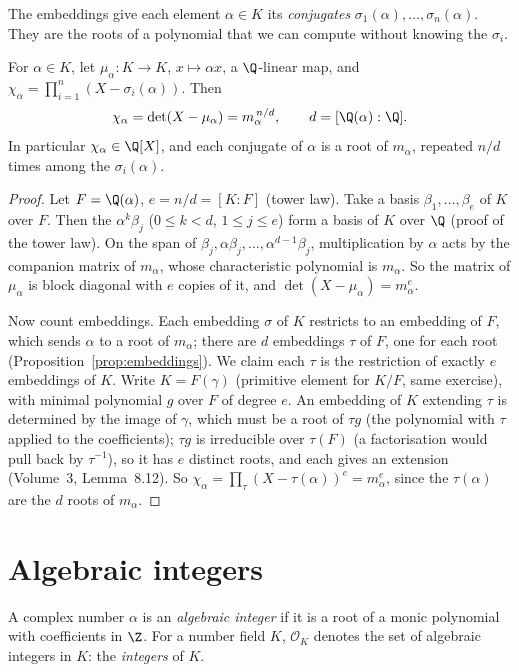 The embeddings give each element $\alpha\in K$ its \emph{conjugates} $\sigma_1(\alpha),\dots,\sigma_n(\alpha)$. They
are the roots of a polynomial that we can compute without knowing the $\sigma_i$.

\begin{proposition}\label{prop:charpoly}
For $\alpha\in K$, let $\mu_\alpha:K\to K$, $x\mapsto\alpha x$, a $\Q$-linear map, and
$\chi_\alpha=\prod_{i=1}^n(X-\sigma_i(\alpha))$. Then
\[
\chi_\alpha=\det(X-\mu_\alpha)=m_\alpha^{\,n/d},\qquad d=[\Q(\alpha):\Q].
\]
In particular $\chi_\alpha\in\Q[X]$, and each conjugate of $\alpha$ is a root of $m_\alpha$, repeated $n/d$ times
among the $\sigma_i(\alpha)$.
\end{proposition}
\begin{proof}
Let $F=\Q(\alpha)$, $e=n/d=[K:F]$ (tower law). Take a basis $\beta_1,\dots,\beta_e$ of $K$ over $F$. Then the
$\alpha^k\beta_j$ ($0\le k<d$, $1\le j\le e$) form a basis of $K$ over $\Q$ (proof of the tower law). On the span of
$\beta_j,\alpha\beta_j,\dots,\alpha^{d-1}\beta_j$, multiplication by $\alpha$ acts by the companion matrix of
$m_\alpha$, whose characteristic polynomial is $m_\alpha$. So the matrix of $\mu_\alpha$ is block diagonal with $e$
copies of it, and $\det(X-\mu_\alpha)=m_\alpha^e$.

Now count embeddings. Each embedding $\sigma$ of $K$ restricts to an embedding of $F$, which sends $\alpha$ to a root of
$m_\alpha$; there are $d$ embeddings $\tau$ of $F$, one for each root (Proposition~\ref{prop:embeddings}). We claim each
$\tau$ is the restriction of exactly $e$ embeddings of $K$. Write $K=F(\gamma)$ (primitive element for $K/F$, same
exercise), with minimal polynomial $g$ over $F$ of degree $e$. An embedding of $K$ extending $\tau$ is determined by the
image of $\gamma$, which must be a root of $\tau g$ (the polynomial with $\tau$ applied to the coefficients); $\tau g$
is irreducible over $\tau(F)$ (a factorisation would pull back by $\tau^{-1}$), so it has $e$ distinct roots, and each
gives an extension (Volume~3, Lemma~8.12). So $\chi_\alpha=\prod_\tau(X-\tau(\alpha))^e=m_\alpha^e$, since the
$\tau(\alpha)$ are the $d$ roots of $m_\alpha$.
\end{proof}

\section{Algebraic integers}

\begin{definition}
A complex number $\alpha$ is an \emph{algebraic integer} if it is a root of a monic polynomial with coefficients in $\Z$.
For a number field $K$, $\mathcal O_K$ denotes the set of algebraic integers in $K$: the \emph{integers} of $K$.
\end{definition}

